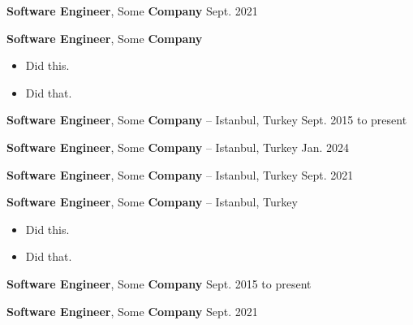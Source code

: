 \documentclass[10pt, letterpaper]{article}
\newenvironment{highlights}{
        \begin{itemize}[
                topsep=0pt,
                partopsep=0pt,
                itemsep=0pt,
                leftmargin=10pt
            ]
    }{
        \end{itemize}
    } %
\begin{document}
        \textbf{Software Engineer}, Some \textbf{Company} \hfill Sept. 2021



        \vspace{8pt}

        \textbf{Software Engineer}, Some \textbf{Company} \hfill 

        \begin{highlights}
        \item Did this.
        \item Did that.
        \end{highlights}


        \vspace{8pt}

        \textbf{Software Engineer}, Some \textbf{Company} -- Istanbul, Turkey \hfill Sept. 2015 to present



        \vspace{8pt}

        \textbf{Software Engineer}, Some \textbf{Company} -- Istanbul, Turkey \hfill Jan. 2024



        \vspace{8pt}

        \textbf{Software Engineer}, Some \textbf{Company} -- Istanbul, Turkey \hfill Sept. 2021



        \vspace{8pt}

        \textbf{Software Engineer}, Some \textbf{Company} -- Istanbul, Turkey \hfill 

        \begin{highlights}
        \item Did this.
        \item Did that.
        \end{highlights}


        \vspace{8pt}

        \textbf{Software Engineer}, Some \textbf{Company} \hfill Sept. 2015 to present



        \vspace{8pt}

        \textbf{Software Engineer}, Some \textbf{Company} \hfill Sept. 2021



        \vspace{8pt}
\end{document}

